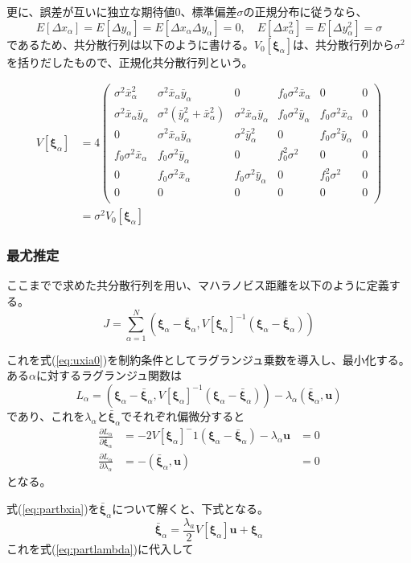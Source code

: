 \documentclass[12pt,a4j]{jsarticle}
\newcommand{\bxa}{\bar{x}_\alpha}
\newcommand{\dxa}{\Delta x_\alpha}
\newcommand{\bya}{\bar{y}_\alpha}
\newcommand{\dya}{\Delta y_\alpha}
\newcommand{\xia}{\bm{\xi}_\alpha}
\newcommand{\bxia}{\bar{\bm{\xi}}_\alpha}
\begin{document}
      更に、誤差が互いに独立な期待値$0$、標準偏差$\sigma$の正規分布に従うなら、
      \begin{equation}
        E[\dxa] = E[\dya] = E[\dxa\dya] = 0, \quad E[\dxa^2] = E[\dya^2] = \sigma
      \end{equation}
      であるため、共分散行列は以下のように書ける。$V_0[\xia]$は、共分散行列から$\sigma^2$を括りだしたもので、正規化共分散行列という。

      \begin{align}
        V[\xia] &= 4 \begin{pmatrix}
          \sigma^2\bxa^2 & \sigma^2\bxa\bya & 0 & f_0\sigma^2\bxa & 0 & 0 \\
          \sigma^2\bxa\bya & \sigma^2(\bya^2 + \bxa^2) & \sigma^2\bxa\bya & f_0\sigma^2\bya & f_0\sigma^2\bxa & 0 \\
          0 & \sigma^2\bxa\bya & \sigma^2\bya^2 & 0 & f_0\sigma^2\bya & 0 \\
          f_0\sigma^2\bxa & f_0\sigma^2\bya & 0 & f_0^2\sigma^2 & 0 & 0 \\
          0 & f_0\sigma^2\bxa & f_0\sigma^2\bya & 0 & f_0^2\sigma^2 & 0 \\
          0 & 0 & 0 & 0 & 0 & 0 \\
        \end{pmatrix} \\
         &= \sigma^2 V_0[\xia] 
      \end{align}
    
    \subsubsection*{最尤推定}
      ここまでで求めた共分散行列を用い、マハラノビス距離を以下のように定義する。
      \begin{equation}
        J = \sum_{\alpha = 1}^N \left(\xia - \bxia, V[\xia]^{-1} (\xia - \bxia) \right)
      \end{equation}
      
      これを式(\ref{eq:uxia0})を制約条件としてラグランジュ乗数を導入し、最小化する。
      ある$\alpha$に対するラグランジュ関数は
      \begin{equation}
        L_\alpha = \left(\xia - \bxia, V[\xia]^{-1} (\xia - \bxia)\right) - \lambda_\alpha (\bxia, \bm{u})
      \end{equation}
      であり、これを$\lambda_\alpha$と$\bxia$でそれぞれ偏微分すると
      \begin{align}
        \frac{\partial L_\alpha}{\partial \bxia} &= -2V[\xia]^-1(\xia - \bxia) - \lambda_\alpha\bm{u} &= 0 \label{eq:partbxia} \\
        \frac{\partial L_\alpha}{\partial \lambda_\alpha} &= -(\bxia, \bm{u}) &= 0 \label{eq:partlambda}
      \end{align}
      となる。

      式(\ref{eq:partbxia})を$\bxia$について解くと、下式となる。
      \begin{equation}
        \bxia = \frac{\lambda_a}{2}V[\xia]\bm{u} + \xia 
      \end{equation}
      これを式(\ref{eq:partlambda})に代入して
\end{document}
